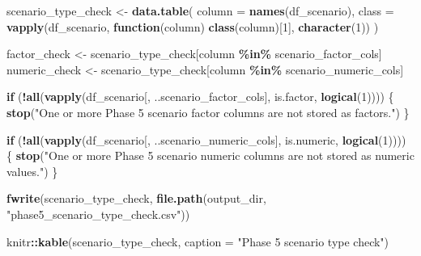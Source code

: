 \documentclass[
]{article}
\newenvironment{Shaded}{\begin{snugshade}}{\end{snugshade}}
\newcommand{\AttributeTok}[1]{\textcolor[rgb]{0.13,0.29,0.53}{#1}}
\newcommand{\ControlFlowTok}[1]{\textcolor[rgb]{0.13,0.29,0.53}{\textbf{#1}}}
\newcommand{\DecValTok}[1]{\textcolor[rgb]{0.00,0.00,0.81}{#1}}
\newcommand{\FunctionTok}[1]{\textcolor[rgb]{0.13,0.29,0.53}{\textbf{#1}}}
\newcommand{\NormalTok}[1]{#1}
\newcommand{\OtherTok}[1]{\textcolor[rgb]{0.56,0.35,0.01}{#1}}
\newcommand{\SpecialCharTok}[1]{\textcolor[rgb]{0.81,0.36,0.00}{\textbf{#1}}}
\newcommand{\StringTok}[1]{\textcolor[rgb]{0.31,0.60,0.02}{#1}}
\begin{document}
\begin{Shaded}
\begin{Highlighting}[]
\NormalTok{scenario\_type\_check }\OtherTok{\textless{}{-}} \FunctionTok{data.table}\NormalTok{(}
  \AttributeTok{column =} \FunctionTok{names}\NormalTok{(df\_scenario),}
  \AttributeTok{class =} \FunctionTok{vapply}\NormalTok{(df\_scenario, }\ControlFlowTok{function}\NormalTok{(column) }\FunctionTok{class}\NormalTok{(column)[}\DecValTok{1}\NormalTok{], }\FunctionTok{character}\NormalTok{(}\DecValTok{1}\NormalTok{))}
\NormalTok{)}

\NormalTok{factor\_check }\OtherTok{\textless{}{-}}\NormalTok{ scenario\_type\_check[column }\SpecialCharTok{\%in\%}\NormalTok{ scenario\_factor\_cols]}
\NormalTok{numeric\_check }\OtherTok{\textless{}{-}}\NormalTok{ scenario\_type\_check[column }\SpecialCharTok{\%in\%}\NormalTok{ scenario\_numeric\_cols]}

\ControlFlowTok{if}\NormalTok{ (}\SpecialCharTok{!}\FunctionTok{all}\NormalTok{(}\FunctionTok{vapply}\NormalTok{(df\_scenario[, ..scenario\_factor\_cols], is.factor, }\FunctionTok{logical}\NormalTok{(}\DecValTok{1}\NormalTok{)))) \{}
  \FunctionTok{stop}\NormalTok{(}\StringTok{"One or more Phase 5 scenario factor columns are not stored as factors."}\NormalTok{)}
\NormalTok{\}}

\ControlFlowTok{if}\NormalTok{ (}\SpecialCharTok{!}\FunctionTok{all}\NormalTok{(}\FunctionTok{vapply}\NormalTok{(df\_scenario[, ..scenario\_numeric\_cols], is.numeric, }\FunctionTok{logical}\NormalTok{(}\DecValTok{1}\NormalTok{)))) \{}
  \FunctionTok{stop}\NormalTok{(}\StringTok{"One or more Phase 5 scenario numeric columns are not stored as numeric values."}\NormalTok{)}
\NormalTok{\}}

\FunctionTok{fwrite}\NormalTok{(scenario\_type\_check, }\FunctionTok{file.path}\NormalTok{(output\_dir, }\StringTok{"phase5\_scenario\_type\_check.csv"}\NormalTok{))}

\NormalTok{knitr}\SpecialCharTok{::}\FunctionTok{kable}\NormalTok{(scenario\_type\_check, }\AttributeTok{caption =} \StringTok{"Phase 5 scenario type check"}\NormalTok{)}
\end{Highlighting}
\end{Shaded}
\end{document}
